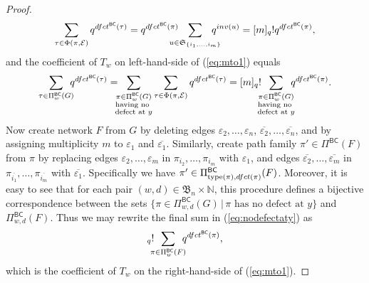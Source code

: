 \documentclass[10pt,a4paper]{amsart}
\newcommand{\PiBC}{\Pi^{\msfBC}}
\newcommand{\bn}{\mathfrak{B}_n}
\newcommand{\dfct}{\textsc{dfct}}
\newcommand{\inv}{\textsc{inv}}
\newcommand{\mfs}[1]{\mathfrak{S}_{#1}}
\newcommand{\msfBC}{\mathsf{BC}}
\newcommand{\nTksp}{\negthickspace\negthickspace}
\newcommand{\ol}[1]{\overline{#1}}
\newcommand{\sumsb}[1]{\sum_{\substack{#1}}}  %
\newcommand{\type}{\mathrm{type}}
\begin{document}
\begin{proof}
 \begin{equation}\label{eq:mqfactorial}
     \sum_{\tau \in \Phi(\pi,\mathcal E)} q^{\dfct^{\msfBC}(\tau)} = q^{\dfct^{\msfBC}(\pi)}\nTksp\nTksp
     \sum_{u \in \mfs{\{i_1,\dotsc,i_m\}}} \nTksp \nTksp q^{\inv(u)}
     = 
     [m]_q! q^{\dfct^{\msfBC}(\pi)},
 \end{equation}
 and the coefficient of $T_w$ on left-hand-side of (\ref{eq:mto1}) equals
 \begin{equation}\label{eq:nodefectaty}
     \sum_{\tau \in \PiBC_w(G)}\nTksp q^{\dfct^{\msfBC}(\tau)} =
     \nTksp\sumsb{\pi \in \PiBC_w(G)\\
     \text{having no }\\\text{defect at } y}
     \sum_{\tau \in \Phi(\pi,\mathcal E)} q^{\dfct^{\msfBC}(\tau)}
     = [m]_q! 
     \nTksp\sumsb{\pi \in \PiBC_w(G)\\ 
     \text{having no }\\\text{defect at } y}\nTksp 
     q^{\dfct^{\msfBC}(\pi)}.
 \end{equation}
 Now create network $F$ from $G$ by deleting edges $\varepsilon_2,\dotsc,\varepsilon_n$, $\ol{\varepsilon_2},\dotsc,\ol{\varepsilon_n}$, and by assigning multiplicity $m$ to $\varepsilon_1$ and $\ol{\varepsilon_1}$. 
 Similarly, create path family $\pi' \in \PiBC(F)$ from $\pi$ by replacing edges $\varepsilon_2,\dotsc,\varepsilon_m$ in $\pi_{i_2},\dotsc,\pi_{i_m}$
 with $\varepsilon_1$, and edges $\ol{\varepsilon_2},\dotsc,\ol{\varepsilon_m}$ 
 in $\pi_{\ol{i_1}},\dotsc,\pi_{\ol{i_m}}$
 with $\ol{\varepsilon_1}$. Specifically we have $\pi' \in \PiBC_{\type(\pi),\dfct(\pi)}(F)$. Moreover, it is easy to see that for each pair $(w,d) \in \bn \times \mathbb N$, this procedure defines a bijective correspondence between the sets
 $\{ \pi \in \PiBC_{w,d}(G) \,|\, \pi \text{ has no defect at } y \}$ and $\PiBC_{w,d}(F)$. Thus we may rewrite the final sum in (\ref{eq:nodefectaty}) as
\begin{equation*}
    [m]_q! \nTksp\sum_{\pi \in \PiBC_w(F)}\nTksp q^{\dfct^{\msfBC}(\pi)},
\end{equation*}
which is the coefficient of $T_w$ on the right-hand-side of (\ref{eq:mto1}).
\end{proof}
\end{document}

